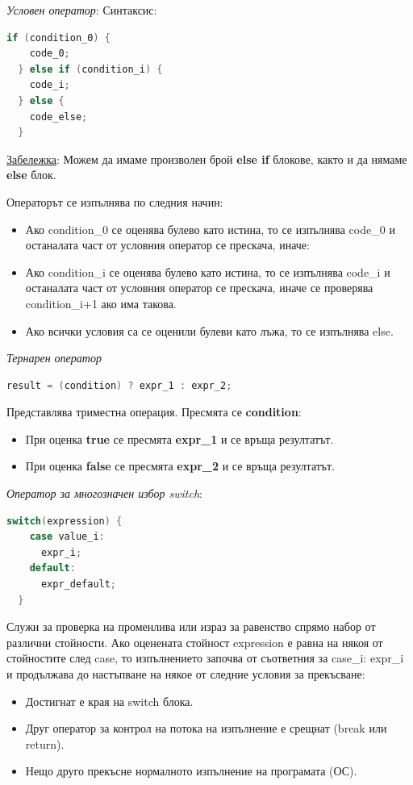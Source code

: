 \documentclass{article}
\renewcommand{\\}{\newline}
\begin{document}
\textit{Условен оператор}: Синтаксис:

\begin{lstlisting}[language=C++]
  if (condition_0) {
    code_0;
  } else if (condition_i) {
    code_i;
  } else {
    code_else;
  }
\end{lstlisting}
\underline{Забележка}: Можем да имаме произволен брой \textbf{else if} блокове, както и да нямаме \textbf{else} блок. 

Операторът се изпълнява по следния начин:\begin{itemize}
    \item Ако condition\_0 се оценява булево като истина, то се изпълнява code\_0 и останалата част от условния оператор се прескача, иначе:
    \item Ако condition\_i се оценява булево като истина, то се изпълнява code\_i и останалата част от условния оператор се прескача, иначе се проверява condition\_i+1 ако има такова. 
    \item Ако всички условия са се оценили булеви като лъжа, то се изпълнява else.
\end{itemize}

\textit{Тернарен оператор} 

\begin{lstlisting}[language=C++]
  result = (condition) ? expr_1 : expr_2;
\end{lstlisting}

Представлява триместна операция. Пресмята се \textbf{condition}:
\begin{itemize}
    \item При оценка \textbf{true} се пресмята \textbf{expr\_1} и се връща резултатът.
    \item При оценка \textbf{false} се пресмята \textbf{expr\_2} и се връща резултатът.
\end{itemize}

\textit{Оператор за многозначен избор switch}: 

\begin{lstlisting}[language=C++]
  switch(expression) {
    case value_i: 
      expr_i;
    default:
      expr_default;
  }
\end{lstlisting}

Служи за проверка на променлива или израз за равенство спрямо набор от различни стойности. Ако оценената стойност expression е равна на някоя от стойностите след case, то изпълнението започва от съответния за case\_i:  expr\_i и продължава до настъпване на някое от следние условия за прекъсване: \begin{itemize}
    \item Достигнат е края на switch блока.
    \item Друг оператор за контрол на потока на изпълнение е срещнат (break или return).
    \item Нещо друго прекъсне нормалното изпълнение на програмата (ОС).
\end{itemize}
\end{document}
